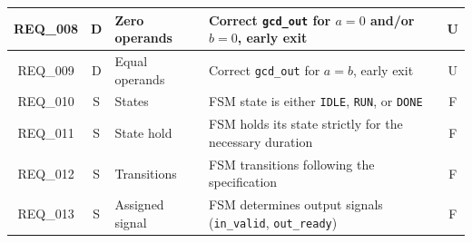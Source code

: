 \begin{table}[H]
\begin{tabularx}{\textwidth}{|c|c|l|X|c|}
        REQ\_008        & D                 & Zero operands         & Correct \texttt{gcd\_out} for $a=0$ and/or $b=0$, early exit                              & U             \\ \midrule
        REQ\_009        & D                 & Equal operands        & Correct \texttt{gcd\_out} for $a=b$, early exit                                           & U             \\ \bottomrule \toprule
        REQ\_010        & S                 & States                & FSM state is either \texttt{IDLE}, \texttt{RUN}, or \texttt{DONE}                         & F             \\ \midrule
        REQ\_011        & S                 & State hold            & FSM holds its state strictly for the necessary duration                                   & F             \\ \midrule
        REQ\_012        & S                 & Transitions           & FSM transitions following the specification                                               & F             \\ \midrule
        REQ\_013        & S                 & Assigned signal       & FSM determines output signals (\texttt{in\_valid}, \texttt{out\_ready})                   & F             \\ \bottomrule
    \end{tabularx}
\end{table}

